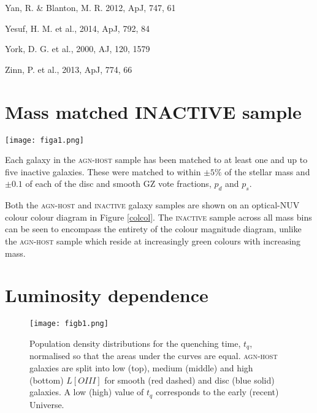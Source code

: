 \documentclass[useAMS,usenatbib]{mn2e}
\def\changedbds    {\color{ncc} }
\def\secondchange    {\color{srv} }
\begin{document}
\begin{thebibliography}{}
 Yan, R. \& Blanton, M. R. 2012, ApJ, 747, 61

 Yesuf, H. M. et al., 2014, ApJ, 792, 84

 York, D. G. et al., 2000, AJ, 120, 1579

 Zinn, P. et al., 2013, ApJ, 774, 66

\end{thebibliography}{}

\appendix

\section{Mass matched INACTIVE sample}

\begin{figure*}
\texttt{[image: figa1.png]}
\caption{Optical-NUV colour-colour contour diagrams for the \textsc{agn-host} (top) and \textsc{inactive} galaxy samples split into low (blue), medium (green) and high (red) stellar mass samples. Underlaying each diagram are the contours of the \textsc{gz2-galex} sample (grey).}
\label{colcol}
\end{figure*}

Each galaxy in the \textsc{agn-host} sample has been matched to at least one and up to five inactive galaxies. These were matched to within $\pm5\%$ of the stellar mass and $\pm 0.1$ of each of the disc and smooth GZ vote fractions, $p_d$ and $p_s$.

Both the \textsc{agn-host} and \textsc{inactive} galaxy samples are shown on an optical-NUV colour colour diagram in Figure \ref{colcol}. The \textsc{inactive} sample across all mass bins can be seen to encompass the entirety of the colour magnitude diagram, unlike the \textsc{agn-host} sample which reside at increasingly green colours with increasing mass. 


\section{Luminosity dependence}

\begin{figure}
\texttt{[image: figb1.png]}
\caption{{\secondchange Population density} distributions for the quenching time, $t_q$, {\changedbds normalised so that the areas under the curves are equal}. \textsc{agn-host} galaxies are split into low (top), medium (middle) and high (bottom)  $L[OIII]$ for smooth (red dashed) and disc (blue solid) galaxies. A low (high) value of $t_q$ corresponds to the early (recent) Universe.}
\label{loiiitime}
\end{figure}
\end{document}
